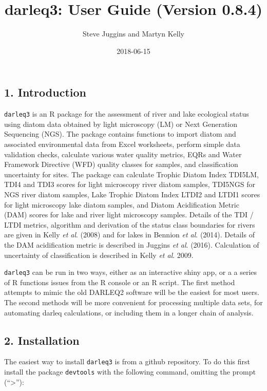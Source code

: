 \documentclass[]{article}
\title{darleq3: User Guide (Version 0.8.4)}
\author{Steve Juggins and Martyn Kelly}
\date{2018-06-15}
\begin{document}
\maketitle

\subsection{1. Introduction}\label{introduction}

\texttt{darleq3} is an R package for the assessment of river and lake
ecological status using diatom data obtained by light microscopy (LM) or
Next Generation Sequencing (NGS). The package contains functions to
import diatom and associated environmental data from Excel worksheets,
perform simple data validation checks, calculate various water quality
metrics, EQRs and Water Framework Directive (WFD) quality classes for
samples, and classification uncertainty for sites. The package can
calculate Trophic Diatom Index TDI5LM, TDI4 and TDI3 scores for light
microscopy river diatom samples, TDI5NGS for NGS river diatom samples,
Lake Trophic Diatom Index LTDI2 and LTDI1 scores for light microscopy
lake diatom samples, and Diatom Acidification Metric (DAM) scores for
lake and river light microscopy samples. Details of the TDI / LTDI
metrics, algorithm and derivation of the status class boundaries for
rivers are given in Kelly \emph{et al}. (2008) and for lakes in Bennion
\emph{et al}. (2014). Details of the DAM acidification metric is
described in Juggins \emph{et al}. (2016). Calculation of uncertainty of
classification is described in Kelly \emph{et al}. 2009.

\texttt{darleq3} can be run in two ways, either as an interactive shiny
app, or a a series of R functions issues from the R console or an R
script. The first method attempts to mimic the old DARLEQ2 software will
be the easiest for most users. The second methods will be more
convenient for processing multiple data sets, for automating darleq
calculations, or including them in a longer chain of analysis.

\subsection{2. Installation}\label{installation}

The easiest way to install \texttt{darleq3} is from a github repository.
To do this first install the package \texttt{devtools} with the
following command, omitting the prompt (``\textgreater{}''):
\end{document}
